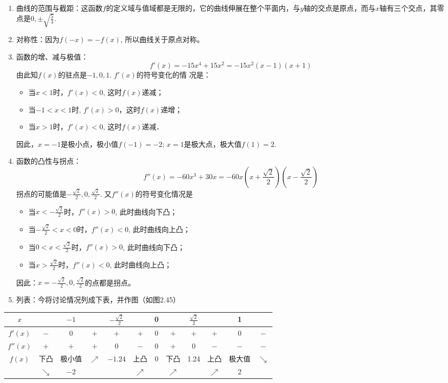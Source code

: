 \begin{solution}
\begin{enumerate}
\item 曲线的范围与截距：这函数$f$的定义域与值域都是无限的，它的曲线伸展在整个平面内，与$y$轴的交点是原点，而与$x$轴有三个交点，其零点是$0,\pm\sqrt{\frac{5}{3}}$.
\item 对称性：因为$f(-x)=-f(x)$, 所以曲线关于原点对称。
\item 函数的增、减与极值：
\[f' (x) =-15x^4+15x^2=-15x^2 (x-1) (x+1)\]
由此知$f(x)$的驻点是$-1, 0, 1$. $f'(x)$的符号变化的情
况是：
\begin{itemize}
    \item 当$x<1$时，$f'(x)<0$, 这时$f(x)$递减；
    \item 当$-1<x<1$时, $f'(x)>0$，这时$f(x)$递增；
    \item 当$x>1$时，$f'(x)<0$, 这时$f(x)$递减．
\end{itemize}
因此，$x=-1$是极小点，极小值$f(-1)=-2$; $x=1$是极大点，极大值$f(1)=2$.
\item 函数的凸性与拐点：
\[f''(x)=-60x^3+30x=-60x\left(x+\frac{\sqrt{2}}{2}\right)\left(x-\frac{\sqrt{2}}{2}\right)\]
拐点的可能值是$-\frac{\sqrt{2}}{2},0,\frac{\sqrt{2}}{2}$. 又$f''(x)$的符号变化情况是
\begin{itemize}
    \item 当$x<-\frac{\sqrt{2}}{2}$时，$f''(x)>0$, 此时曲线向下凸；
    \item 当$-\frac{\sqrt{2}}{2}<x<0$时，$f''(x)<0$, 此时曲线向上凸；
    \item 当$0<x<\frac{\sqrt{2}}{2}$时，$f''(x)>0$, 此时曲线向下凸；
    \item 当$x>\frac{\sqrt{2}}{2}$时，$f''(x)<0$, 此时曲线向上凸；
\end{itemize}
因此：$x=-\frac{\sqrt{2}}{2},0,\frac{\sqrt{2}}{2}$的点都是拐点。

\item 列表：今将讨论情况列成下表，并作图（如图2.45）
\end{enumerate}    
\begin{center}\small
    \begin{tabular}{cccccccccccc}
    \hline
    $x$ & &$-1$&&$-\frac{\sqrt{2}}{2}$&&0&&$\frac{\sqrt{2}}{2}$&&1\\
    \hline
    $f'(x)$& $-$ & 0&$+$&$+$&$+$&0&$+$&$+$&$+$&0&$-$\\
    $f''(x)$&$+$&$+$&$+$&0&$-$&0&$+$&0&$-$&$-$&$-$\\
    $f(x)$&下凸&极小值& $\nearrow$  & $-1.24$&上凸 & 0& 下凸 &1.24& 上凸 & 极大值 & $\searrow$  \\
    & $\searrow $ &$-2$&&&$\nearrow $&&$\nearrow $&&$\nearrow $&2\\
    \hline
    \end{tabular}
    \end{center}
    

\end{solution}
